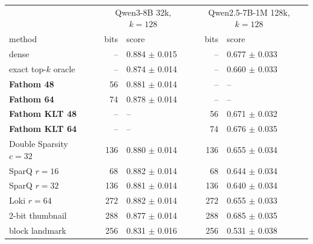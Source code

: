 \begin{tabular}{lrlrl}
\toprule
 & \multicolumn{2}{c}{Qwen3-8B 32k, $k{=}128$} & \multicolumn{2}{c}{Qwen2.5-7B-1M 128k, $k{=}128$} \\
method & bits & score & bits & score \\
\midrule
dense & -- & 0.884 $\pm$ 0.015 & -- & 0.677 $\pm$ 0.033 \\
exact top-$k$ oracle & -- & 0.874 $\pm$ 0.014 & -- & 0.660 $\pm$ 0.033 \\
\textbf{Fathom 48} & 56 & 0.881 $\pm$ 0.014 & -- & -- \\
\textbf{Fathom 64} & 74 & 0.878 $\pm$ 0.014 & -- & -- \\
\textbf{Fathom KLT 48} & -- & -- & 56 & 0.671 $\pm$ 0.032 \\
\textbf{Fathom KLT 64} & -- & -- & 74 & 0.676 $\pm$ 0.035 \\
Double Sparsity $c{=}32$ & 136 & 0.880 $\pm$ 0.014 & 136 & 0.655 $\pm$ 0.034 \\
SparQ $r{=}16$ & 68 & 0.882 $\pm$ 0.014 & 68 & 0.644 $\pm$ 0.034 \\
SparQ $r{=}32$ & 136 & 0.881 $\pm$ 0.014 & 136 & 0.640 $\pm$ 0.034 \\
Loki $r{=}64$ & 272 & 0.882 $\pm$ 0.014 & 272 & 0.655 $\pm$ 0.033 \\
2-bit thumbnail & 288 & 0.877 $\pm$ 0.014 & 288 & 0.685 $\pm$ 0.035 \\
block landmark & 256 & 0.831 $\pm$ 0.016 & 256 & 0.531 $\pm$ 0.038 \\
\bottomrule
\end{tabular}